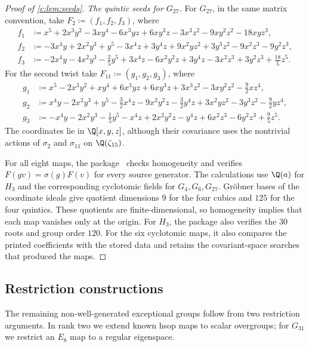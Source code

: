 \documentclass[10pt,a4paper]{amsart}
\newcommand{\defeq}{\coloneqq}
\theoremstyle{definition}
\begin{document}
\begin{proof}[Proof of \cref{c:lem:seeds}]
\emph{The quintic seeds for $G_{27}$.}\label{sec:g27-seeds}
For $G_{27}$, in the same matrix convention, take
$F_2\defeq(f_1,f_2,f_3)$, where
\begin{align*}
 f_1&\defeq x^5+2x^3y^2-3xy^4-6x^3yz+6xy^3z
          -3x^3z^2-9xy^2z^2-18xyz^3,\\
 f_2&\defeq -3x^4y+2x^2y^3+y^5-3x^4z+3y^4z
          +9x^2yz^2+3y^3z^2-9x^2z^3-9y^2z^3,\\
 f_3&\defeq -2x^4y-4x^2y^3-\tfrac25y^5+3x^4z-6x^2y^2z+3y^4z
          -3x^2z^3+3y^2z^3+\tfrac{18}5z^5.
\end{align*}
For the second twist take $F_{11}\defeq(g_1,g_2,g_3)$, where
\begin{align*}
 g_1&\defeq x^5-2x^3y^2+xy^4+6x^3yz+6xy^3z
          +3x^3z^2-3xy^2z^2-\tfrac92xz^4,\\
 g_2&\defeq x^4y-2x^2y^3+y^5-\tfrac32x^4z-9x^2y^2z-\tfrac32y^4z
          +3x^2yz^2-3y^3z^2-\tfrac92yz^4,\\
 g_3&\defeq -x^4y-2x^2y^3-\tfrac15y^5-x^4z+2x^2y^2z-y^4z
          +6x^2z^3-6y^2z^3+\tfrac95z^5.
\end{align*}
The coordinates lie in $\Q[x,y,z]$, although their covariance uses
the nontrivial actions of $\sigma_2$ and $\sigma_{11}$ on
$\Q(\zeta_{15})$.

For all eight maps, the package~\cite{Computations} checks homogeneity
and verifies $F(gv)=\sigma(g)F(v)$ for every source generator. The calculations use
$\Q(a)$ for $H_3$ and the corresponding cyclotomic fields for
$G_4,G_6,G_{27}$. Gr\"obner bases of the coordinate ideals give
quotient dimensions $9$ for the four cubics and $125$ for the four
quintics. These quotients are finite-dimensional, so homogeneity
implies that each map vanishes only at the origin. For $H_3$, the
package also verifies the $30$ roots and group order $120$.
For the six cyclotomic maps, it also compares the printed coefficients
with the stored data and retains the covariant-space searches that
produced the maps.
\end{proof}

\subsection{Restriction constructions}\label{c:sec:restrictions}

The remaining non-well-generated exceptional groups follow from
two restriction arguments. In rank two we extend known hsop maps
to scalar overgroups; for $G_{31}$ we restrict an $E_8$ map to a
regular eigenspace.
\end{document}
